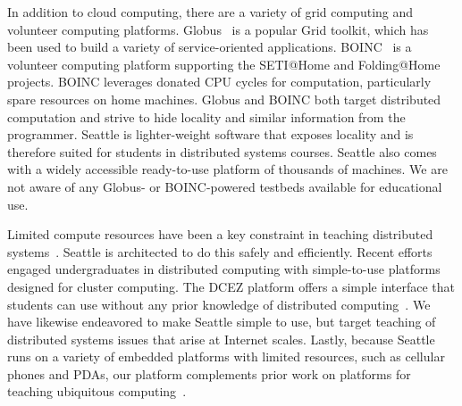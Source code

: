 In addition to cloud computing, there are a variety of grid computing
and volunteer computing platforms. Globus~\cite{Globus} is a popular
Grid toolkit, which has been used to build a variety of
service-oriented applications. BOINC~\cite{BOINC} is a volunteer
computing platform supporting the SETI@Home and Folding@Home projects.
BOINC leverages donated CPU cycles for computation, particularly spare
resources on home machines. %
Globus and BOINC both target distributed computation and strive to
hide locality and similar information from the programmer. Seattle is
lighter-weight software that exposes locality and is therefore suited
for students in distributed systems courses. Seattle also comes with a
widely accessible ready-to-use platform of thousands of machines. We
are not aware of any Globus- or BOINC-powered testbeds available for
educational use.



Limited compute resources have been a key constraint in teaching
distributed systems~\cite{SIGCSE94}. Seattle is architected to do this
safely and efficiently. %
Recent efforts engaged undergraduates in distributed computing with
simple-to-use platforms designed for cluster
computing. %
The DCEZ platform offers a simple interface that students can use
without any prior knowledge of distributed
computing~\cite{SIGCSE07}. %
We have likewise endeavored to make Seattle simple to use, but
target teaching of distributed systems issues that arise at Internet
scales. Lastly, because Seattle runs on a variety of embedded
platforms with limited resources, such as cellular phones and PDAs,
our platform complements prior work on platforms for teaching
ubiquitous computing~\cite{SIGCSE03}.

